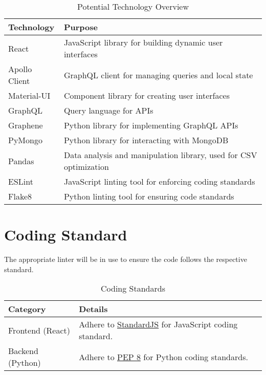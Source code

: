 \documentclass{article}
\begin{document}
\begin{table}[htbp]
    \centering
    \begin{tabularx}{\textwidth}{|l|>{\raggedright\arraybackslash}X|}  
    \hline
    Technology & Purpose \\
    \hline
    React & JavaScript library for building dynamic user interfaces \\
    \hline
    Apollo Client & GraphQL client for managing queries and local state \\
    \hline
    Material-UI & Component library for creating user interfaces \\
    \hline
    GraphQL & Query language for APIs \\
    \hline
    Graphene & Python library for implementing GraphQL APIs \\
    \hline
    PyMongo & Python library for interacting with MongoDB \\
    \hline
    Pandas & Data analysis and manipulation library, used for CSV optimization \\
    \hline
    ESLint & JavaScript linting tool for enforcing coding standards \\
    \hline
    Flake8 & Python linting tool for ensuring code standards \\
    \hline
    \end{tabularx}
    \caption{Potential Technology Overview}
\end{table}



\section{Coding Standard}

The appropriate linter will be in use to ensure the code follows the respective standard.
\begin{table}[htbp]
    \centering
    \begin{tabularx}{\textwidth}{|l|>{\raggedright\arraybackslash}X|}
    \hline
    Category & Details \\
    \hline
    Frontend (React) & Adhere to \href{https://standardjs.com/}{StandardJS} for JavaScript coding standard. \\
    \hline
    Backend (Python) & Adhere to \href{https://www.python.org/dev/peps/pep-0008/}{PEP 8} for Python coding standards. \\
    \hline
    \end{tabularx}
    \caption{Coding Standards}
\end{table}
\end{document}
